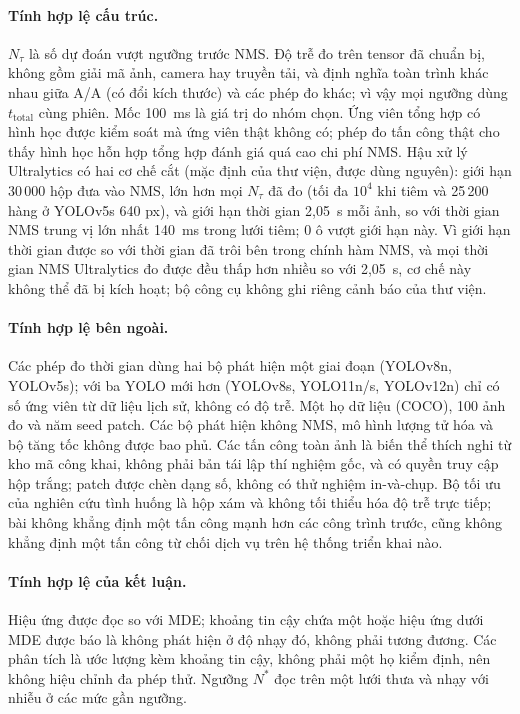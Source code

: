 \documentclass[a4paper,fleqn]{cas-dc}
\newcommand{\Ntau}{N_{\tau}}
\begin{document}
\paragraph{Tính hợp lệ cấu trúc.}
$\Ntau$ là số dự đoán vượt ngưỡng trước NMS. Độ trễ đo trên tensor đã chuẩn bị, không gồm giải mã ảnh, camera hay truyền tải, và định nghĩa toàn trình khác nhau giữa A/A (có đổi kích thước) và các phép đo khác; vì vậy mọi ngưỡng dùng $t_{\mathrm{total}}$ cùng phiên. Mốc 100~ms là giá trị do nhóm chọn. Ứng viên tổng hợp có hình học được kiểm soát mà ứng viên thật không có; phép đo tấn công thật cho thấy hình học hỗn hợp tổng hợp đánh giá quá cao chi phí NMS. Hậu xử lý Ultralytics có hai cơ chế cắt (mặc định của thư viện, được dùng nguyên): giới hạn 30\,000 hộp đưa vào NMS, lớn hơn mọi $\Ntau$ đã đo (tối đa $10^4$ khi tiêm và 25\,200 hàng ở YOLOv5s 640 px), và giới hạn thời gian 2,05~s mỗi ảnh, so với thời gian NMS trung vị lớn nhất 140~ms trong lưới tiêm; 0 ô vượt giới hạn này. Vì giới hạn thời gian được so với thời gian đã trôi bên trong chính hàm NMS, và mọi thời gian NMS Ultralytics đo được đều thấp hơn nhiều so với 2,05~s, cơ chế này không thể đã bị kích hoạt; bộ công cụ không ghi riêng cảnh báo của thư viện.
\paragraph{Tính hợp lệ bên ngoài.}
Các phép đo thời gian dùng hai bộ phát hiện một giai đoạn (YOLOv8n, YOLOv5s); với ba YOLO mới hơn (YOLOv8s, YOLO11n/s, YOLOv12n) chỉ có số ứng viên từ dữ liệu lịch sử, không có độ trễ. Một họ dữ liệu (COCO), 100 ảnh đo và năm seed patch. Các bộ phát hiện không NMS, mô hình lượng tử hóa và bộ tăng tốc không được bao phủ. Các tấn công toàn ảnh là biến thể thích nghi từ kho mã công khai, không phải bản tái lập thí nghiệm gốc, và có quyền truy cập hộp trắng; patch được chèn dạng số, không có thử nghiệm in-và-chụp. Bộ tối ưu của nghiên cứu tình huống là hộp xám và không tối thiểu hóa độ trễ trực tiếp; bài không khẳng định một tấn công mạnh hơn các công trình trước, cũng không khẳng định một tấn công từ chối dịch vụ trên hệ thống triển khai nào.
\paragraph{Tính hợp lệ của kết luận.}
Hiệu ứng được đọc so với MDE; khoảng tin cậy chứa một hoặc hiệu ứng dưới MDE được báo là không phát hiện ở độ nhạy đó, không phải tương đương. Các phân tích là ước lượng kèm khoảng tin cậy, không phải một họ kiểm định, nên không hiệu chỉnh đa phép thử. Ngưỡng $N^{*}$ đọc trên một lưới thưa và nhạy với nhiễu ở các mức gần ngưỡng.
\end{document}
